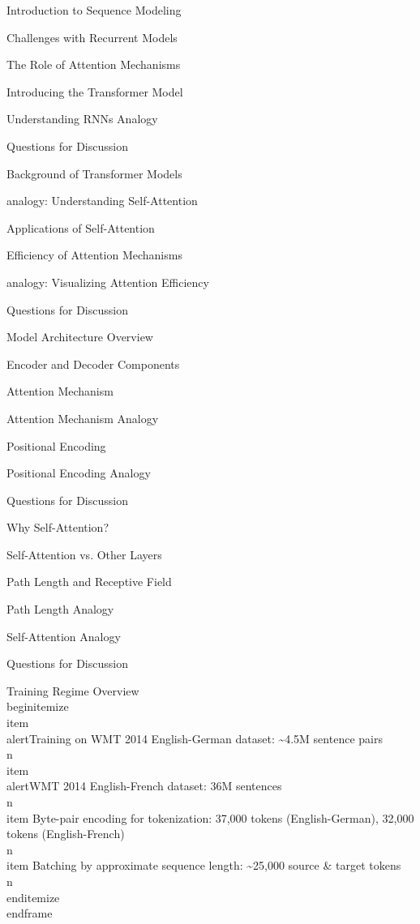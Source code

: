 \documentclass{beamer}
\begin{document}
\begin{frame}[]{Introduction to Sequence Modeling}
\begin{frame}[]{Challenges with Recurrent Models}
\begin{frame}[]{The Role of Attention Mechanisms}
\begin{frame}[]{Introducing the Transformer Model}
\begin{frame}[plain]{Understanding RNNs Analogy}
\begin{frame}[]{Questions for Discussion}
\begin{frame}[]{Background of Transformer Models}
\begin{frame}[plain]{analogy: Understanding Self-Attention}
\begin{frame}[]{Applications of Self-Attention}
\begin{frame}[]{Efficiency of Attention Mechanisms}
\begin{frame}[plain]{analogy: Visualizing Attention Efficiency}
\begin{frame}[]{Questions for Discussion}
\begin{frame}[]{Model Architecture Overview}
\begin{frame}[]{Encoder and Decoder Components}
\begin{frame}[]{Attention Mechanism}
\begin{frame}[plain]{Attention Mechanism Analogy}
\begin{frame}[]{Positional Encoding}
\begin{frame}[plain]{Positional Encoding Analogy}
\begin{frame}[]{Questions for Discussion}
\begin{frame}[]{Why Self-Attention?}
\begin{frame}[]{Self-Attention vs. Other Layers}
\begin{frame}[]{Path Length and Receptive Field}
\begin{frame}[plain]{Path Length Analogy}
\begin{frame}[plain]{Self-Attention Analogy}
\begin{frame}[]{Questions for Discussion}
\begingroup
{}\n{}\n\begin{frame}[]{Training Regime Overview}\n\\begin{itemize}
\\item \\alert{Training on WMT 2014 English-German dataset: \textasciitilde{}4.5M sentence pairs}\\n\\item \\alert{WMT 2014 English-French dataset: 36M sentences}\\n\\item Byte-pair encoding for tokenization: 37,000 tokens (English-German), 32,000 tokens (English-French)\\n\\item Batching by approximate sequence length: \textasciitilde{}25,000 source \& target tokens\\n\\end{itemize}
\\end{frame}

\endgroup


\end{frame}
\end{frame}
\end{frame}
\end{frame}
\end{frame}
\end{frame}
\end{frame}
\end{frame}
\end{frame}
\end{frame}
\end{frame}
\end{frame}
\end{frame}
\end{frame}
\end{frame}
\end{frame}
\end{frame}
\end{frame}
\end{frame}
\end{frame}
\end{frame}
\end{frame}
\end{frame}
\end{frame}
\end{frame}
\end{frame}
\end{document}
